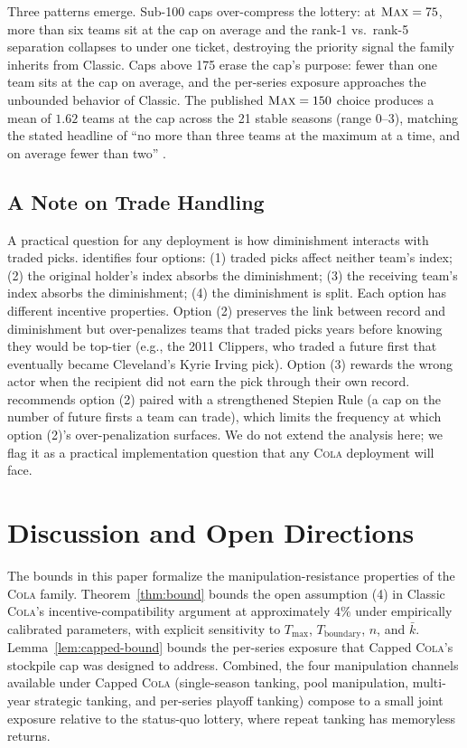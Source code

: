 \documentclass{article}
\newcommand{\cola}{\textup{\textsc{Cola}}}
\newcommand{\Max}{\textup{\textsc{Max}}}
\begin{document}
Three patterns emerge. Sub-100 caps over-compress the lottery: at $\Max = 75$, more than six teams sit at the cap on average and the rank-1 vs.\ rank-5 separation collapses to under one ticket, destroying the priority signal the family inherits from Classic. Caps above 175 erase the cap's purpose: fewer than one team sits at the cap on average, and the per-series exposure approaches the unbounded behavior of Classic. The published $\Max = 150$ choice produces a mean of $1.62$ teams at the cap across the 21 stable seasons (range 0--3), matching the stated headline of ``no more than three teams at the maximum at a time, and on average fewer than two'' \citep{highley2026solvable5}.

\subsection{A Note on Trade Handling}

A practical question for any deployment is how diminishment interacts with traded picks. \citet{highley2026solvable4} identifies four options: (1) traded picks affect neither team's index; (2) the original holder's index absorbs the diminishment; (3) the receiving team's index absorbs the diminishment; (4) the diminishment is split. Each option has different incentive properties. Option (2) preserves the link between record and diminishment but over-penalizes teams that traded picks years before knowing they would be top-tier (e.g., the 2011 Clippers, who traded a future first that eventually became Cleveland's Kyrie Irving pick). Option (3) rewards the wrong actor when the recipient did not earn the pick through their own record. \citet{highley2026solvable4} recommends option (2) paired with a strengthened Stepien Rule (a cap on the number of future firsts a team can trade), which limits the frequency at which option (2)'s over-penalization surfaces. We do not extend the analysis here; we flag it as a practical implementation question that any \cola{} deployment will face.

\section{Discussion and Open Directions}
\label{sec:discussion}

The bounds in this paper formalize the manipulation-resistance properties of the \cola{} family. Theorem~\ref{thm:bound} bounds the open assumption (4) in Classic \cola{}'s incentive-compatibility argument at approximately $4\%$ under empirically calibrated parameters, with explicit sensitivity to $T_{\max}$, $T_{\text{boundary}}$, $n$, and $\bar{k}$. Lemma~\ref{lem:capped-bound} bounds the per-series exposure that Capped \cola{}'s stockpile cap was designed to address. Combined, the four manipulation channels available under Capped \cola{} (single-season tanking, pool manipulation, multi-year strategic tanking, and per-series playoff tanking) compose to a small joint exposure relative to the status-quo lottery, where repeat tanking has memoryless returns.
\end{document}
